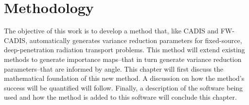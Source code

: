 \chapter{Methodology}

The objective of this work is to develop a method that, like CADIS and FW-CADIS,
automatically generates variance reduction parameters for fixed-source,
deep-penetration radiation transport problems. This method will extend existing
methods to generate importance maps--that in turn generate variance reduction
parameters--that are informed by angle. This chapter will first
discuss the mathematical foundation of this new method. A discussion on how
the method's success will be quantified will follow. Finally, a description of
the software being used and how the method is added to this software will
conclude this chapter.




